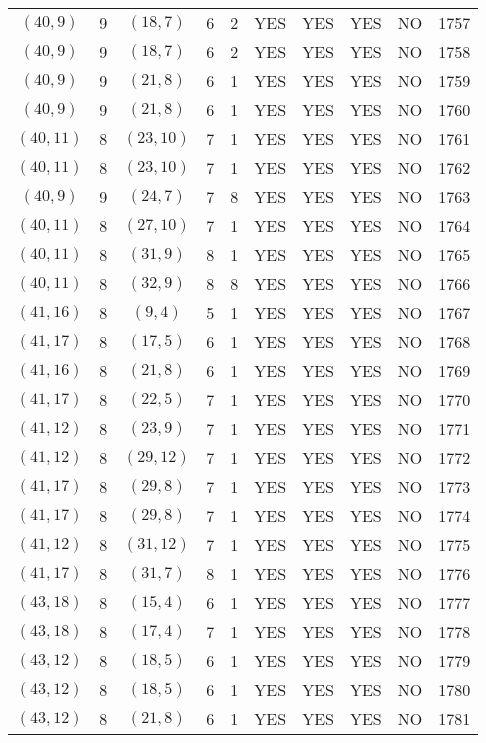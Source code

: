 \begin{longtable}{|c|c|c|c|c|c|c|c|c|c|}
$(40, 9)$ & 9 & $(18, 7)$ & 6 & 2 & YES & YES & YES & NO & 1757\\
$(40, 9)$ & 9 & $(18, 7)$ & 6 & 2 & YES & YES & YES & NO & 1758\\
$(40, 9)$ & 9 & $(21, 8)$ & 6 & 1 & YES & YES & YES & NO & 1759\\
$(40, 9)$ & 9 & $(21, 8)$ & 6 & 1 & YES & YES & YES & NO & 1760\\
$(40, 11)$ & 8 & $(23, 10)$ & 7 & 1 & YES & YES & YES & NO & 1761\\
$(40, 11)$ & 8 & $(23, 10)$ & 7 & 1 & YES & YES & YES & NO & 1762\\
$(40, 9)$ & 9 & $(24, 7)$ & 7 & 8 & YES & YES & YES & NO & 1763\\
$(40, 11)$ & 8 & $(27, 10)$ & 7 & 1 & YES & YES & YES & NO & 1764\\
$(40, 11)$ & 8 & $(31, 9)$ & 8 & 1 & YES & YES & YES & NO & 1765\\
$(40, 11)$ & 8 & $(32, 9)$ & 8 & 8 & YES & YES & YES & NO & 1766\\
$(41, 16)$ & 8 & $(9, 4)$ & 5 & 1 & YES & YES & YES & NO & 1767\\
$(41, 17)$ & 8 & $(17, 5)$ & 6 & 1 & YES & YES & YES & NO & 1768\\
$(41, 16)$ & 8 & $(21, 8)$ & 6 & 1 & YES & YES & YES & NO & 1769\\
$(41, 17)$ & 8 & $(22, 5)$ & 7 & 1 & YES & YES & YES & NO & 1770\\
$(41, 12)$ & 8 & $(23, 9)$ & 7 & 1 & YES & YES & YES & NO & 1771\\
$(41, 12)$ & 8 & $(29, 12)$ & 7 & 1 & YES & YES & YES & NO & 1772\\
$(41, 17)$ & 8 & $(29, 8)$ & 7 & 1 & YES & YES & YES & NO & 1773\\
$(41, 17)$ & 8 & $(29, 8)$ & 7 & 1 & YES & YES & YES & NO & 1774\\
$(41, 12)$ & 8 & $(31, 12)$ & 7 & 1 & YES & YES & YES & NO & 1775\\
$(41, 17)$ & 8 & $(31, 7)$ & 8 & 1 & YES & YES & YES & NO & 1776\\
$(43, 18)$ & 8 & $(15, 4)$ & 6 & 1 & YES & YES & YES & NO & 1777\\
$(43, 18)$ & 8 & $(17, 4)$ & 7 & 1 & YES & YES & YES & NO & 1778\\
$(43, 12)$ & 8 & $(18, 5)$ & 6 & 1 & YES & YES & YES & NO & 1779\\
$(43, 12)$ & 8 & $(18, 5)$ & 6 & 1 & YES & YES & YES & NO & 1780\\
$(43, 12)$ & 8 & $(21, 8)$ & 6 & 1 & YES & YES & YES & NO & 1781\\

\end{longtable}
